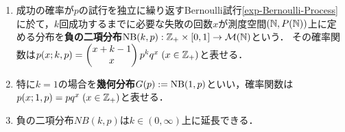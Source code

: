 \documentclass[uplatex,dvipdfmx]{jsreport}
\begin{document}
\begin{definition}\mbox{}
    \begin{enumerate}
        \item 成功の確率が$p$の試行を独立に繰り返すBernoulli試行\ref{exp-Bernoulli-Process}に於て，$k$回成功するまでに必要な失敗の回数$x$が測度空間$(\mathbb{N},P(\mathbb{N}))$上に定める分布を\textbf{負の二項分布}$\mathrm{NB}(k,p):\mathbb{Z}_+\times[0,1]\to\mathcal{M}(\mathbb{N})$という．
        その確率関数は$p(x;k,p)=\begin{pmatrix}x+k-1\\x\end{pmatrix}p^kq^x\;(x\in\mathbb{Z}_+)$と表せる．
        \item 特に$k=1$の場合を\textbf{幾何分布}$G(p):=\mathrm{NB}(1,p)$といい，確率関数は$p(x;1,p)=pq^x\;(x\in\mathbb{Z}_+)$と表せる．
        \item 負の二項分布$NB(k,p)$は$k\in(0,\infty)$上に延長できる．
    \end{enumerate}
\end{definition}
\end{document}
